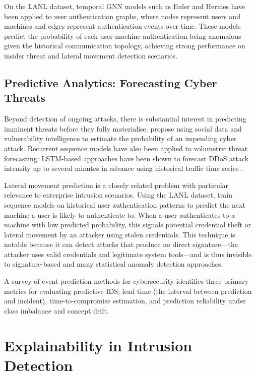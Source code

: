 \documentclass[12pt,a4paper]{report}
\begin{document}
On the LANL dataset, temporal GNN models such as Euler \citep{king2023} and Hermes \citep{lo2023} have been applied to user authentication graphs, where nodes represent users and machines and edges represent authentication events over time. These models predict the probability of each user-machine authentication being anomalous given the historical communication topology, achieving strong performance on insider threat and lateral movement detection scenarios.

\subsection{Predictive Analytics: Forecasting Cyber Threats}
\label{sec:predictive}

Beyond detection of ongoing attacks, there is substantial interest in predicting imminent threats before they fully materialise. \citet{munkhdorj2017} propose using social data and vulnerability intelligence to estimate the probability of an impending cyber attack. Recurrent sequence models have also been applied to volumetric threat forecasting: LSTM-based approaches have been shown to forecast DDoS attack intensity up to several minutes in advance using historical traffic time series \citep{kong2025}.

Lateral movement prediction is a closely related problem with particular relevance to enterprise intrusion scenarios. Using the LANL dataset, \citet{turcotte2017} train sequence models on historical user authentication patterns to predict the next machine a user is likely to authenticate to. When a user authenticates to a machine with low predicted probability, this signals potential credential theft or lateral movement by an attacker using stolen credentials. This technique is notable because it can detect attacks that produce no direct signature---the attacker uses valid credentials and legitimate system tools---and is thus invisible to signature-based and many statistical anomaly detection approaches.

A survey of event prediction methods for cybersecurity \citep{sonmez2023} identifies three primary metrics for evaluating predictive IDS: lead time (the interval between prediction and incident), time-to-compromise estimation, and prediction reliability under class imbalance and concept drift.

\section{Explainability in Intrusion Detection}
\label{sec:xai}
\end{document}
